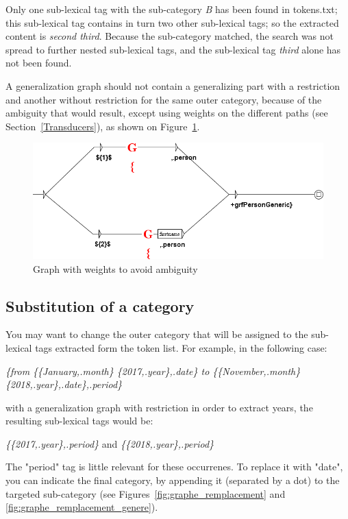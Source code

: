 \bigskip
\noindent Only one sub-lexical tag with the sub-category \textit{B}
has been found in tokens.txt; this sub-lexical tag contains in turn two other sub-lexical tags; so the extracted content
is \textit{second third}. Because the sub-category matched,
the search was not spread to further nested sub-lexical tags, and the sub-lexical tag \textit{third} alone has not been found.

\bigskip
\noindent A generalization graph should not contain a generalizing part with a restriction and another
without restriction for the same outer category, because of the ambiguity that would result, except using weights
on the different paths (see Section~\ref{Transducers}), as shown on Figure~\ref{fig:graphe_poids}.

\begin{figure}[!htb]
  \centering
  \includegraphics[width=14cm]{resources/img/graphe_poids.png}
  \caption{Graph with weights to avoid ambiguity}
  \label{fig:graphe_poids}
\end{figure}

\bigskip
\subsection{Substitution of a category}
You may want to change the outer category that will be assigned to the
sub-lexical tags extracted form the token list. For example, in the following case:

\bigskip
\noindent
\emph{\{from \{\{January,.month\} \{2017,.year\},.date\} to \{\{November,.month\} \{2018,.year\},.date\},.period\}}

\bigskip
\noindent with a generalization graph with restriction in order to extract years, the resulting sub-lexical tags would be:

\bigskip
\emph{\{\{2017,.year\},.period\}} and \emph{\{\{2018,.year\},.period\}}

\bigskip
\noindent The "period" tag is little relevant for these occurrenes. To replace it with "date",
you can indicate the final category, by appending it (separated by a dot)
to the targeted sub-category (see Figures~\ref{fig:graphe_remplacement} and
\ref{fig:graphe_remplacement_genere}).

